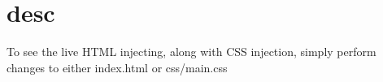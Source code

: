 \chapter{desc}
\hypertarget{md__d_1_2_g_i_t_2_food_link_2foodlink_8client_2node__modules_2bs-recipes_2recipes_2grunt_8html_8injection_2desc}{}\label{md__d_1_2_g_i_t_2_food_link_2foodlink_8client_2node__modules_2bs-recipes_2recipes_2grunt_8html_8injection_2desc}
To see the live HTML injecting, along with CSS injection, simply perform changes to either {\ttfamily index.\+html} or {\ttfamily css/main.\+css} 